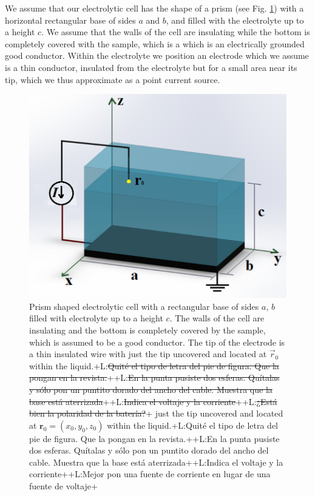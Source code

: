 \documentclass{article}
\newcommand{\notaL}[1]{{\color{blue}+L:#1+}}
\begin{document}
We assume that our electrolytic cell has the shape of a
prism (see Fig. \ref{f:celda}) with a horizontal rectangular base of sides $a$ and $b$, and
filled with the electrolyte up to a height $c$. We assume that the
walls of the cell are insulating while the bottom is completely
covered with the sample, which is a which is an
electrically grounded good conductor. Within the electrolyte we position an electrode
which we assume is a thin conductor, insulated from the electrolyte
but for a small area near its tip, which we thus approximate as a
point current source.
\begin{figure}
  \centering
  \includegraphics[width=\textwidth]{Images/celdan1}
  \caption{Prism shaped electrolytic cell with a rectangular base of
    sides $a$, $b$ filled with electrolyte up to a height $c$. The
    walls of the cell are insulating and the bottom is completely
    covered by the sample, which is assumed to be a good
    conductor. The tip of the electrode is a thin insulated wire with
    just the tip uncovered and located at $ \vec{r}_0 $ within the
    liquid.\notaL{\sout{Quité el tipo de letra del pie de figura. Que la pongan en la
      revista.}}\notaL{\sout{En la punta pusiste dos esferas. Quítalas y sólo
    pon un puntito dorado del ancho del cable. Muestra que la base
    está aterrizada}}\notaL{\sout{Indica el voltaje y la
    corriente}}\notaL{\sout{¿Está bien la polaridad de la batería?}}
    just the tip uncovered and located at $\bm r_0=(x_0,y_0,z_0)$ within the
    liquid.\notaL{Quité el tipo de letra del pie de figura. Que la pongan en la
      revista.}\notaL{En la punta pusiste dos esferas. Quítalas y sólo
    pon un puntito dorado del ancho del cable. Muestra que la base
    está aterrizada}\notaL{Indica el voltaje y la
    corriente}\notaL{Mejor pon una fuente de corriente en lugar de una
  fuente de voltaje}}
  \label{f:celda}
\end{figure}
\end{document}
